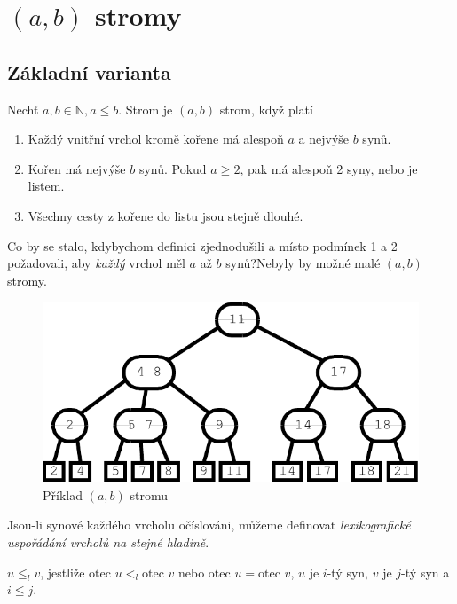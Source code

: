 
\chapter{$(a,b)$ stromy}

\section{Základní varianta}

Nechť $a, b \in \mathbb{N}, a \leq b$. Strom je $(a,b)$ strom, když
platí
\begin{enumerate}
\item Každý vnitřní vrchol kromě kořene má alespoň $a$ a nejvýše $b$
synů.
\item Kořen má nejvýše $b$ synů. Pokud $a \geq 2$, pak má alespoň 2
syny, nebo je listem.
\item Všechny cesty z kořene do listu jsou stejně dlouhé.
\end{enumerate}
\exercise
{Co by se stalo, kdybychom definici zjednodušili a místo podmínek 1 a
2 požadovali, aby \emph{každý} vrchol měl $a$ až $b$ synů?}{Nebyly by
možné malé $(a,b)$ stromy.}

\begin{figure}%
\centering\includegraphics{pics/abt}
\caption{Příklad $(a,b)$ stromu}
\label{abt}
\end{figure}

\begin{defn}
Jsou-li synové každého vrcholu očíslováni, můžeme
definovat \emph{lexikografické uspořádání vrcholů na stejné hladině}.

$u \leq_l v$, jestliže $\text{otec } u <_l \text{otec } v$ nebo
$\text{otec } u = \text{otec } v$, $u$ je $i$-tý syn, $v$ je $j$-tý syn
a $i \leq j$.
\end{defn}

